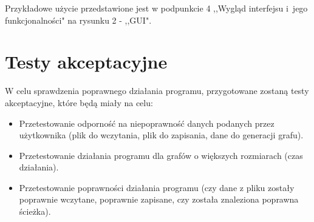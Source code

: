 \documentclass[12pt, a4paper]{article}
\begin{document}
Przykładowe użycie przedstawione jest w podpunkcie 4 ,,Wygląd interfejsu i~jego funkcjonalności" na rysunku 2 - ,,GUI".




\section{Testy akceptacyjne}
W celu sprawdzenia poprawnego działania programu, przygotowane zostaną testy akceptacyjne, które będą miały na celu:
\begin{itemize}
    \item Przetestowanie odporność na niepoprawność danych podanych przez użytkownika (plik do wczytania, plik do zapisania, dane do generacji grafu).
    \item Przetestowanie działania programu dla grafów o większych rozmiarach (czas działania).
    \item Przetestowanie poprawności działania programu (czy dane z pliku zostały poprawnie wczytane, poprawnie zapisane, czy została znaleziona poprawna ścieżka).
\end{itemize}
\end{document}
